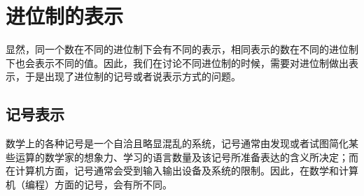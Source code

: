 \section{进位制的表示}\label{sec:NumberSystemBasics/PositionalNotationPresentation}
    显然，同一个数在不同的进位制下会有不同的表示，相同表示的数在不同的进位制下也会表示不同的值。因此，我们在讨论不同进位制的时候，需要对进位制做出表示，于是出现了进位制的记号或者说表示方式的问题。
    \subsection{记号表示}\label{subsec:NumberSystemBasics/PositionalNotationPresentation/Natural}
        数学上的各种记号是一个自洽且略显混乱的系统，记号通常由发现或者试图简化某些运算的数学家的想象力、学习的语言数量及该记号所准备表达的含义所决定；而在计算机方面，记号通常会受到输入输出设备及系统的限制。因此，在数学和计算机（编程）方面的记号，会有所不同。
